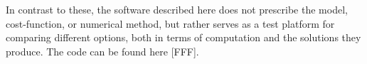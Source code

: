 In contrast to these, the software described here does not prescribe the model, cost-function, or numerical method, but rather serves as a test platform for comparing different options, both in terms of computation and the solutions they produce. The code can be found here [FFF].




 





